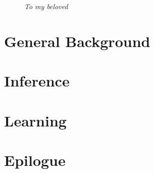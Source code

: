\documentclass[g5paper,phd,electronic]{kthesis}
\begin{document}
\frontmatter
\maketitle
\thispagestyle{empty}
\vfill
\begin{figure}
\begin{flushright}
\Large
\textit{To my beloved}
\end{flushright}
\end{figure}
\vfill







\tableofcontents


\mainmatter



\part{General Background}
\label{part:background}


\part{Inference}
\label{part:inference}





\part{Learning}
\label{part:learning}









\part{Epilogue}





\end{document}
